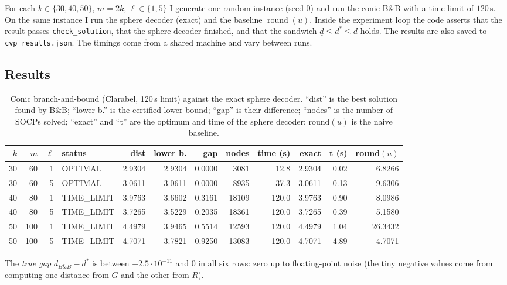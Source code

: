 \documentclass[11pt,a4paper]{article}
\newcommand{\BB}{B\&B}
\begin{document}
For each $k\in\{30,40,50\}$, $m=2k$, $\ell\in\{1,5\}$ I generate one random instance (seed $0$) and run the conic \BB{} with a time limit of $120$\,s. On the same instance I run the sphere decoder (exact) and the baseline $\operatorname{round}(u)$. Inside the experiment loop the code asserts that the result passes \texttt{check\_solution}, that the sphere decoder finished, and that the sandwich $\underline d\le d^\ast\le d$ holds. The results are also saved to \texttt{cvp\_results.json}. The timings come from a shared machine and vary between runs.

\subsection{Results}

\begin{table}[H]
\centering
\small
\setlength{\tabcolsep}{4pt}
\begin{tabular}{rrr|lrrrrr|rr|r}
\toprule
$k$ & $m$ & $\ell$ & status & dist & lower b. & gap & nodes & time (s) & exact & t (s) & round$(u)$\\
\midrule
30 & 60  & 1 & OPTIMAL     & 2.9304 & 2.9304 & 0.0000 & 3081  & 12.8  & 2.9304 & 0.02 & 6.8266\\
30 & 60  & 5 & OPTIMAL     & 3.0611 & 3.0611 & 0.0000 & 8935  & 37.3  & 3.0611 & 0.13 & 9.6306\\
40 & 80  & 1 & TIME\_LIMIT & 3.9763 & 3.6602 & 0.3161 & 18109 & 120.0 & 3.9763 & 0.90 & 8.0986\\
40 & 80  & 5 & TIME\_LIMIT & 3.7265 & 3.5229 & 0.2035 & 18361 & 120.0 & 3.7265 & 0.39 & 5.1580\\
50 & 100 & 1 & TIME\_LIMIT & 4.4979 & 3.9465 & 0.5514 & 12593 & 120.0 & 4.4979 & 1.04 & 26.3432\\
50 & 100 & 5 & TIME\_LIMIT & 4.7071 & 3.7821 & 0.9250 & 13083 & 120.0 & 4.7071 & 4.89 & 4.7071\\
\bottomrule
\end{tabular}
\caption{Conic branch-and-bound (Clarabel, 120\,s limit) against the exact sphere decoder. ``dist'' is the best solution found by \BB{}; ``lower b.'' is the certified lower bound; ``gap'' is their difference; ``nodes'' is the number of SOCPs solved; ``exact'' and ``t'' are the optimum and time of the sphere decoder; round$(u)$ is the naive baseline.}
\label{tab:results}
\end{table}

The \emph{true gap} $d_{\BB{}}-d^\ast$ is between $-2.5\cdot10^{-11}$ and $0$ in all six rows: zero up to floating-point noise (the tiny negative values come from computing one distance from $G$ and the other from $R$).
\end{document}
